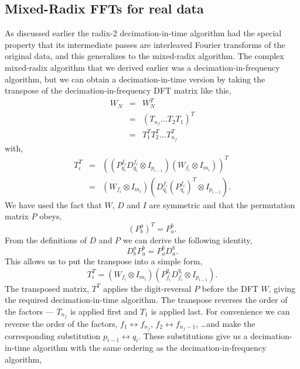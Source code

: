 \documentclass[fleqn,12pt]{article}
\begin{document}
\subsection{Mixed-Radix FFTs for real data}
%
As discussed earlier the radix-2 decimation-in-time algorithm had the
special property that its intermediate passes are interleaved Fourier
transforms of the original data, and this generalizes to the
mixed-radix algorithm. The complex mixed-radix algorithm that we
derived earlier was a decimation-in-frequency algorithm, but we can
obtain a decimation-in-time version by taking the transpose of the
decimation-in-frequency DFT matrix like this,
%
\begin{eqnarray}
W_N &=& W_N^T  \\
&=& (T_{n_f} \dots T_2 T_1)^T \\
&=& T_1^T T_2^T \dots T_{n_f}^T
\end{eqnarray}
%
with,
%
\begin{eqnarray}
T_i^T &=& \left( (P^{f_i}_{q_i} D^{f_i}_{q_i} \otimes I_{p_{i-1}})
        (W_{f_i} \otimes I_{m_i}) \right)^T \\
        &=&     (W_{f_i} \otimes I_{m_i})
                ( D^{f_i}_{q_i} (P^{f_i}_{q_i})^T \otimes I_{p_{i-1}}).
\end{eqnarray}
%
We have used the fact that $W$, $D$ and $I$ are symmetric and that the
permutation matrix $P$ obeys,
%
\begin{equation}
(P^a_b)^T = P^b_a.
\end{equation}
%
From the definitions of $D$ and $P$ we can derive the following identity,
%
\begin{equation}
D^a_b P^b_a = P^b_a D^b_a.
\end{equation}
%
This allows us to put the transpose into a simple form,
%
\begin{equation}
T_i^T =         (W_{f_i} \otimes I_{m_i})
                (P^{q_i}_{f_i} D^{q_i}_{f_i} \otimes I_{p_{i-1}}).
\end{equation}
%
The transposed matrix, $T^T$ applies the digit-reversal $P$ before the
DFT $W$, giving the required decimation-in-time algorithm.  The
transpose reverses the order of the factors --- $T_{n_f}$ is applied
first and $T_1$ is applied last. For convenience we can reverse the
order of the factors, $f_1 \leftrightarrow f_{n_f}$, $f_2
\leftrightarrow f_{n_f-1}$, \dots and make the corresponding
substitution $p_{i-1} \leftrightarrow q_i$. These substitutions give
us a decimation-in-time algorithm with the same ordering as the
decimation-in-frequency algorithm,
\end{document}
